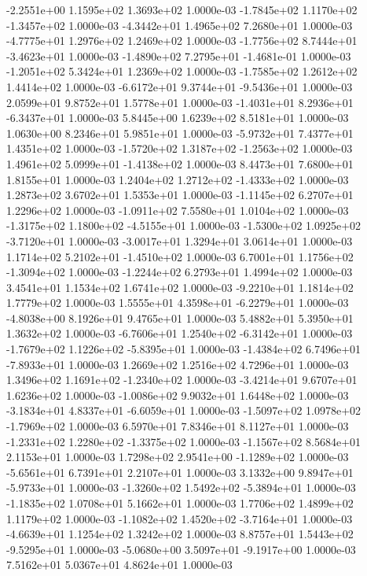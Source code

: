 -2.2551e+00  1.1595e+02  1.3693e+02  1.0000e-03
-1.7845e+02  1.1170e+02 -1.3457e+02  1.0000e-03
-4.3442e+01  1.4965e+02  7.2680e+01  1.0000e-03
-4.7775e+01  1.2976e+02  1.2469e+02  1.0000e-03
-1.7756e+02  8.7444e+01 -3.4623e+01  1.0000e-03
-1.4890e+02  7.2795e+01 -1.4681e-01  1.0000e-03
-1.2051e+02  5.3424e+01  1.2369e+02  1.0000e-03
-1.7585e+02  1.2612e+02  1.4414e+02  1.0000e-03
-6.6172e+01  9.3744e+01 -9.5436e+01  1.0000e-03
2.0599e+01 9.8752e+01 1.5778e+01  1.0000e-03
-1.4031e+01  8.2936e+01 -6.3437e+01  1.0000e-03
5.8445e+00 1.6239e+02 8.5181e+01  1.0000e-03
1.0630e+00 8.2346e+01 5.9851e+01  1.0000e-03
-5.9732e+01  7.4377e+01  1.4351e+02  1.0000e-03
-1.5720e+02  1.3187e+02 -1.2563e+02  1.0000e-03
 1.4961e+02  5.0999e+01 -1.4138e+02  1.0000e-03
8.4473e+01 7.6800e+01 1.8155e+01  1.0000e-03
 1.2404e+02  1.2712e+02 -1.4333e+02  1.0000e-03
1.2873e+02 3.6702e+01 1.5353e+01  1.0000e-03
-1.1145e+02  6.2707e+01  1.2296e+02  1.0000e-03
-1.0911e+02  7.5580e+01  1.0104e+02  1.0000e-03
-1.3175e+02  1.1800e+02 -4.5155e+01  1.0000e-03
-1.5300e+02  1.0925e+02 -3.7120e+01  1.0000e-03
-3.0017e+01  1.3294e+01  3.0614e+01  1.0000e-03
 1.1714e+02  5.2102e+01 -1.4510e+02  1.0000e-03
 6.7001e+01  1.1756e+02 -1.3094e+02  1.0000e-03
-1.2244e+02  6.2793e+01  1.4994e+02  1.0000e-03
3.4541e+01 1.1534e+02 1.6741e+02  1.0000e-03
-9.2210e+01  1.1814e+02  1.7779e+02  1.0000e-03
 1.5555e+01  4.3598e+01 -6.2279e+01  1.0000e-03
-4.8038e+00  8.1926e+01  9.4765e+01  1.0000e-03
5.4882e+01 5.3950e+01 1.3632e+02  1.0000e-03
-6.7606e+01  1.2540e+02 -6.3142e+01  1.0000e-03
-1.7679e+02  1.1226e+02 -5.8395e+01  1.0000e-03
-1.4384e+02  6.7496e+01 -7.8933e+01  1.0000e-03
1.2669e+02 1.2516e+02 4.7296e+01  1.0000e-03
 1.3496e+02  1.1691e+02 -1.2340e+02  1.0000e-03
-3.4214e+01  9.6707e+01  1.6236e+02  1.0000e-03
-1.0086e+02  9.9032e+01  1.6448e+02  1.0000e-03
-3.1834e+01  4.8337e+01 -6.6059e+01  1.0000e-03
-1.5097e+02  1.0978e+02 -1.7969e+02  1.0000e-03
6.5970e+01 7.8346e+01 8.1127e+01  1.0000e-03
-1.2331e+02  1.2280e+02 -1.3375e+02  1.0000e-03
-1.1567e+02  8.5684e+01  2.1153e+01  1.0000e-03
 1.7298e+02  2.9541e+00 -1.1289e+02  1.0000e-03
-5.6561e+01  6.7391e+01  2.2107e+01  1.0000e-03
 3.1332e+00  9.8947e+01 -5.9733e+01  1.0000e-03
-1.3260e+02  1.5492e+02 -5.3894e+01  1.0000e-03
-1.1835e+02  1.0708e+01  5.1662e+01  1.0000e-03
1.7706e+02 1.4899e+02 1.1179e+02  1.0000e-03
-1.1082e+02  1.4520e+02 -3.7164e+01  1.0000e-03
-4.6639e+01  1.1254e+02  1.3242e+02  1.0000e-03
 8.8757e+01  1.5443e+02 -9.5295e+01  1.0000e-03
-5.0680e+00  3.5097e+01 -9.1917e+00  1.0000e-03
7.5162e+01 5.0367e+01 4.8624e+01  1.0000e-03
